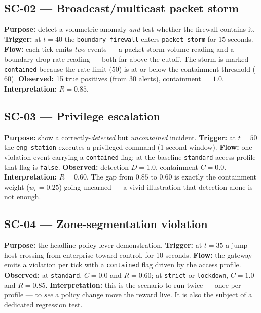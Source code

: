 \documentclass[11pt]{article}
\newcommand{\code}[1]{\texttt{\small #1}}
\begin{document}
\subsection{SC-02 --- Broadcast/multicast packet storm}
\textbf{Purpose:} detect a volumetric anomaly \emph{and} test whether the firewall
contains it. \textbf{Trigger:} at $t=40$ the \code{boundary-firewall} enters
\code{packet\_storm} for 15 seconds. \textbf{Flow:} each tick emits \emph{two}
events --- a packet-storm-volume reading and a boundary-drop-rate reading --- both
far above the cutoff. The storm is marked \code{contained} because the rate limit
($50$) is at or below the containment threshold ($60$). \textbf{Observed:} 15 true
positives (from 30 alerts), containment $=1.0$. \textbf{Interpretation:} $R=0.85$.

\subsection{SC-03 --- Privilege escalation}
\textbf{Purpose:} show a correctly-\emph{detected} but \emph{uncontained} incident.
\textbf{Trigger:} at $t=50$ the \code{eng-station} executes a privileged command
(1-second window). \textbf{Flow:} one violation event carrying a \code{contained}
flag; at the baseline \code{standard} access profile that flag is \code{false}.
\textbf{Observed:} detection $D=1.0$, containment $C=0.0$. \textbf{Interpretation:}
$R=0.60$. The gap from $0.85$ to $0.60$ is exactly the containment weight
($w_c=0.25$) going unearned --- a vivid illustration that detection alone is not
enough.

\subsection{SC-04 --- Zone-segmentation violation}
\textbf{Purpose:} the headline policy-lever demonstration. \textbf{Trigger:} at
$t=35$ a jump-host crossing from enterprise toward control, for 10 seconds.
\textbf{Flow:} the gateway emits a violation per tick with a \code{contained} flag
driven by the access profile. \textbf{Observed:} at \code{standard}, $C=0.0$ and
$R=0.60$; at \code{strict} or \code{lockdown}, $C=1.0$ and $R=0.85$.
\textbf{Interpretation:} this is the scenario to run twice --- once per profile ---
to \emph{see} a policy change move the reward live. It is also the subject of a
dedicated regression test.
\end{document}
